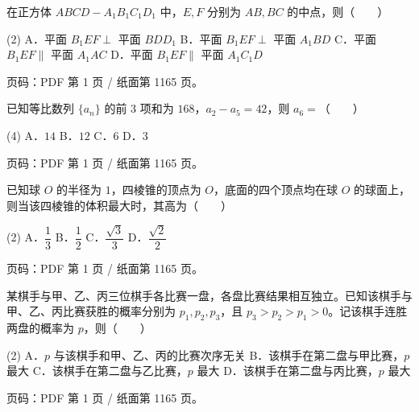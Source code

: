 \begin{question}
在正方体 $ABCD-A_1B_1C_1D_1$ 中，$E,F$ 分别为 $AB,BC$ 的中点，则\mbox{（　　）}

\begin{gkopts}(2)
\task A．平面 $B_1EF\perp$ 平面 $BDD_1$
\task B．平面 $B_1EF\perp$ 平面 $A_1BD$
\task C．平面 $B_1EF\parallel$ 平面 $A_1AC$
\task D．平面 $B_1EF\parallel$ 平面 $A_1C_1D$
\end{gkopts}

\begin{gktip}
页码：PDF 第 1 页 / 纸面第 1165 页。
\end{gktip}

\end{question}
\begin{question}
已知等比数列 $\{a_n\}$ 的前 3 项和为 $168$，$a_2-a_5=42$，则 $a_6=$\mbox{（　　）}

\begin{gkopts}(4)
\task A．$14$
\task B．$12$
\task C．$6$
\task D．$3$
\end{gkopts}

\begin{gktip}
页码：PDF 第 1 页 / 纸面第 1165 页。
\end{gktip}

\end{question}
\begin{question}
已知球 $O$ 的半径为 $1$，四棱锥的顶点为 $O$，底面的四个顶点均在球 $O$ 的球面上，则当该四棱锥的体积最大时，其高为\mbox{（　　）}

\begin{gkopts}(2)
\task A．$\dfrac13$
\task B．$\dfrac12$
\task C．$\dfrac{\sqrt3}{3}$
\task D．$\dfrac{\sqrt2}{2}$
\end{gkopts}

\begin{gktip}
页码：PDF 第 1 页 / 纸面第 1165 页。
\end{gktip}

\end{question}
\begin{question}
某棋手与甲、乙、丙三位棋手各比赛一盘，各盘比赛结果相互独立。已知该棋手与甲、乙、丙比赛获胜的概率分别为 $p_1,p_2,p_3$，且 $p_3>p_2>p_1>0$。记该棋手连胜两盘的概率为 $p$，则\mbox{（　　）}

\begin{gkopts}(2)
\task A．$p$ 与该棋手和甲、乙、丙的比赛次序无关
\task B．该棋手在第二盘与甲比赛，$p$ 最大
\task C．该棋手在第二盘与乙比赛，$p$ 最大
\task D．该棋手在第二盘与丙比赛，$p$ 最大
\end{gkopts}

\begin{gktip}
页码：PDF 第 1 页 / 纸面第 1165 页。
\end{gktip}

\end{question}
